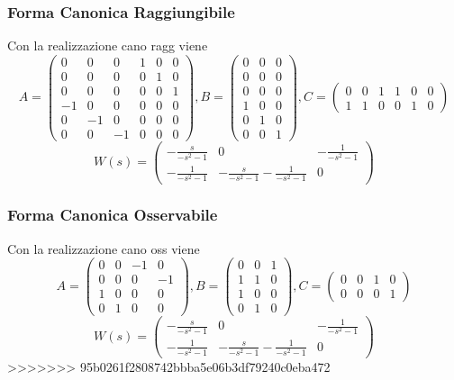 \documentclass{article}
\begin{document}
\subsubsection{Forma Canonica Raggiungibile}
Con la realizzazione cano ragg viene \[ A = \left(\begin{matrix}0 & 0 & 0 & 1 & 0 & 0\\0 & 0 & 0 & 0 & 1 & 0\\0 & 0 & 0 & 0 & 0 & 1\\-1 & 0 & 0 & 0 & 0 & 0\\0 & -1 & 0 & 0 & 0 & 0\\0 & 0 & -1 & 0 & 0 & 0\end{matrix}\right), B = \left(\begin{matrix}0 & 0 & 0\\0 & 0 & 0\\0 & 0 & 0\\1 & 0 & 0\\0 & 1 & 0\\0 & 0 & 1\end{matrix}\right), C= \left(\begin{matrix}0 & 0 & 1 & 1 & 0 & 0\\1 & 1 & 0 & 0 & 1 & 0\end{matrix}\right) \]
\[ W(s) = \left(\begin{matrix}- \frac{s}{- s^{2} - 1} & 0 & - \frac{1}{- s^{2} - 1}\\- \frac{1}{- s^{2} - 1} & - \frac{s}{- s^{2} - 1} - \frac{1}{- s^{2} - 1} & 0\end{matrix}\right) 
\]\subsubsection{Forma Canonica Osservabile}
Con la realizzazione cano oss viene \[ A = \left(\begin{matrix}0 & 0 & -1 & 0\\0 & 0 & 0 & -1\\1 & 0 & 0 & 0\\0 & 1 & 0 & 0\end{matrix}\right), B = \left(\begin{matrix}0 & 0 & 1\\1 & 1 & 0\\1 & 0 & 0\\0 & 1 & 0\end{matrix}\right), C= \left(\begin{matrix}0 & 0 & 1 & 0\\0 & 0 & 0 & 1\end{matrix}\right) \]
\[ W(s) = \left(\begin{matrix}- \frac{s}{- s^{2} - 1} & 0 & - \frac{1}{- s^{2} - 1}\\- \frac{1}{- s^{2} - 1} & - \frac{s}{- s^{2} - 1} - \frac{1}{- s^{2} - 1} & 0\end{matrix}\right) 
\]
>>>>>>> 95b0261f2808742bbba5e06b3df79240c0eba472
\end{document}
